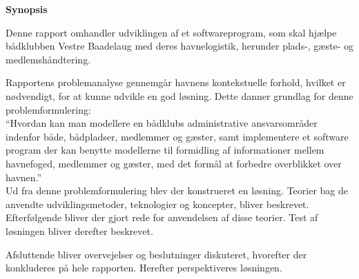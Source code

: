 \begin{center}\textbf{Synopsis}\\ \end{center}

Denne rapport omhandler udviklingen af et softwareprogram, som skal hjælpe bådklubben Vestre Baadelaug med deres havnelogistik, herunder plads-, gæste- og medlemshåndtering.

Rapportens problemanalyse gennemgår havnens kontekstuelle forhold, hvilket er nødvendigt, for at kunne udvikle en god løsning. Dette danner grundlag for denne problemformulering:\\

\enquote{Hvordan kan man modellere en bådklubs administrative ansvarsområder indenfor både, bådpladser, medlemmer og gæster, samt implementere et software program der kan benytte modellerne til formidling af informationer mellem havnefoged, medlemmer og gæster, med det formål at forbedre overblikket over havnen.}\\
	
Ud fra denne problemformulering blev der konstrueret en løsning. Teorier bag de anvendte udviklingsmetoder, teknologier og koncepter, bliver beskrevet. Efterfølgende bliver der gjort rede for anvendelsen af disse teorier. Test af løsningen bliver derefter beskrevet.

Afsluttende bliver overvejelser og beslutninger diskuteret, hvorefter der konkluderes på hele rapporten. Herefter perspektiveres løsningen.
